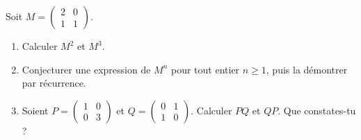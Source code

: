 \documentclass[11pt]{article}
\begin{document}
\begin{exercice}
Soit $M = \begin{pmatrix} 2 & 0 \\ 1 & 1 \end{pmatrix}$.
\begin{enumerate}
\item Calculer $M^2$ et $M^3$.
\item Conjecturer une expression de $M^n$ pour tout entier $n \geq 1$, puis la démontrer par récurrence.
\item Soient $P = \begin{pmatrix} 1 & 0 \\ 0 & 3 \end{pmatrix}$ et $Q = \begin{pmatrix} 0 & 1 \\ 1 & 0 \end{pmatrix}$. Calculer $PQ$ et $QP$. Que constates-tu ?
\end{enumerate}
\end{exercice}
\end{document}
